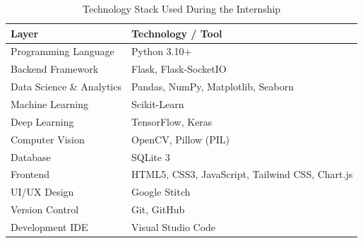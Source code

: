 \begin{table}[H]
\centering
\begin{tabular}{|>{\raggedright\arraybackslash}p{4.5cm}|>{\raggedright\arraybackslash}p{8.5cm}|}
\hline
\textbf{Layer} & \textbf{Technology / Tool} \\
\hline
Programming Language & Python 3.10+ \\
\hline
Backend Framework & Flask, Flask-SocketIO \\
\hline
Data Science \& Analytics & Pandas, NumPy, Matplotlib, Seaborn \\
\hline
Machine Learning & Scikit-Learn \\
\hline
Deep Learning & TensorFlow, Keras \\
\hline
Computer Vision & OpenCV, Pillow (PIL) \\
\hline
Database & SQLite 3 \\
\hline
Frontend & HTML5, CSS3, JavaScript, Tailwind CSS, Chart.js \\
\hline
UI/UX Design & Google Stitch \\
\hline
Version Control & Git, GitHub \\
\hline
Development IDE & Visual Studio Code \\
\hline
\end{tabular}
\caption{Technology Stack Used During the Internship}
\label{tab:techstack}
\end{table}
